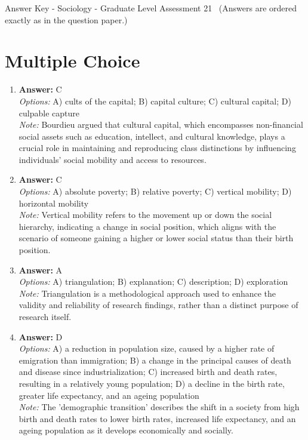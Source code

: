 \documentclass[12pt]{article}
\begin{document}
\begin{center}
Answer Key - Sociology - Graduate Level Assessment 21 \
\small (Answers are ordered exactly as in the question paper.)
\end{center}

\section*{Multiple Choice}
\begin{enumerate}[label=\arabic*.]
\item \textbf{Answer:} C
\\ \textit{Options:} A) cults of the capital; B) capital culture; C) cultural capital; D) culpable capture
\\ \textit{Note:} Bourdieu argued that cultural capital, which encompasses non-financial social assets such as education, intellect, and cultural knowledge, plays a crucial role in maintaining and reproducing class distinctions by influencing individuals' social mobility and access to resources.
\item \textbf{Answer:} C
\\ \textit{Options:} A) absolute poverty; B) relative poverty; C) vertical mobility; D) horizontal mobility
\\ \textit{Note:} Vertical mobility refers to the movement up or down the social hierarchy, indicating a change in social position, which aligns with the scenario of someone gaining a higher or lower social status than their birth position.
\item \textbf{Answer:} A
\\ \textit{Options:} A) triangulation; B) explanation; C) description; D) exploration
\\ \textit{Note:} Triangulation is a methodological approach used to enhance the validity and reliability of research findings, rather than a distinct purpose of research itself.
\item \textbf{Answer:} D
\\ \textit{Options:} A) a reduction in population size, caused by a higher rate of emigration than immigration; B) a change in the principal causes of death and disease since industrialization; C) increased birth and death rates, resulting in a relatively young population; D) a decline in the birth rate, greater life expectancy, and an ageing population
\\ \textit{Note:} The 'demographic transition' describes the shift in a society from high birth and death rates to lower birth rates, increased life expectancy, and an ageing population as it develops economically and socially.

\end{enumerate}
\end{document}

